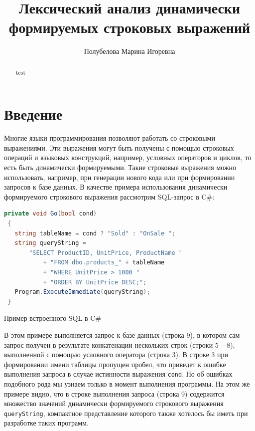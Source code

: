 
\title{Лексический анализ динамически формируемых строковых выражений}


\author{Полубелова Марина Игоревна}



\maketitle             

\begin{abstract}
test
\end{abstract}



\section*{Введение}

Многие языки программирования позволяют работать со строковыми выражениями. Эти выражения могут быть получены с помощью строковых операций и языковых конструкций, например, условных операторов и циклов, то есть быть динамически формируемыми. Такие строковые выражения можно использовать, например, при генерации нового кода или при формировании запросов к базе данных. В качестве примера использования динамически формируемого строкового выражения рассмотрим SQL-запрос в C\#:    

\begin{listing}[H]
    \begin{lstlisting}[language=csharp]
 private void Go(bool cond)
 {
   string tableName = cond ? "Sold" : "OnSale ";
   string queryString =
       "SELECT ProductID, UnitPrice, ProductName " 
           + "FROM dbo.products_" + tableName
           + "WHERE UnitPrice > 1000 "
           + "ORDER BY UnitPrice DESC;";
   Program.ExecuteImmediate(queryString);
 }
    \end{lstlisting}
\caption{Пример встроенного SQL в C\#}
\label{lst:verbments}
\end{listing}

В этом примере выполняется запрос к базе данных (строка 9), в котором сам запрос получен в результате конкатенации нескольких строк (строки 5 -- 8), выполненной с помощью условного оператора (строка 3). В строке 3 при формировании имени таблицы пропущен пробел, что приведет к ошибке выполнения запроса в случае истинности выражения \verb|cond|. Но об ошибках подобного рода мы узнаем только в момент выполнения программы. На этом же примере видно, что в строке выполнения запроса (строка 9) содержится множество значений динамически формируемого строкового выражения \verb|queryString|, компактное представление которого также хотелось бы иметь при разработке таких программ.


